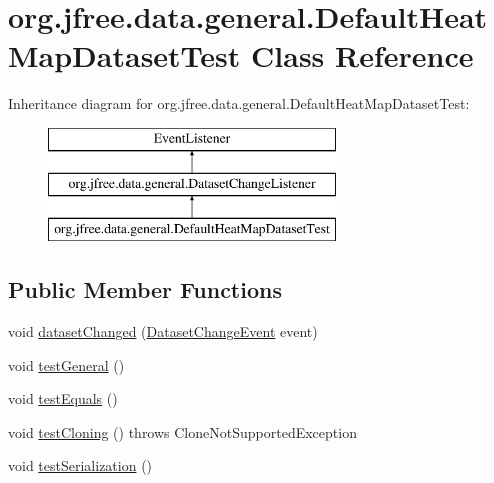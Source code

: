 \hypertarget{classorg_1_1jfree_1_1data_1_1general_1_1_default_heat_map_dataset_test}{}\section{org.\+jfree.\+data.\+general.\+Default\+Heat\+Map\+Dataset\+Test Class Reference}
\label{classorg_1_1jfree_1_1data_1_1general_1_1_default_heat_map_dataset_test}
Inheritance diagram for org.\+jfree.\+data.\+general.\+Default\+Heat\+Map\+Dataset\+Test\+:\begin{figure}[H]
\begin{center}
\leavevmode
\includegraphics[height=3.000000cm]{classorg_1_1jfree_1_1data_1_1general_1_1_default_heat_map_dataset_test}
\end{center}
\end{figure}
\subsection*{Public Member Functions}
\begin{DoxyCompactItemize}
\item 
void \mbox{\hyperlink{classorg_1_1jfree_1_1data_1_1general_1_1_default_heat_map_dataset_test_a100da8375a9df33cfaf02122bac9f131}{dataset\+Changed}} (\mbox{\hyperlink{classorg_1_1jfree_1_1data_1_1general_1_1_dataset_change_event}{Dataset\+Change\+Event}} event)
\item 
void \mbox{\hyperlink{classorg_1_1jfree_1_1data_1_1general_1_1_default_heat_map_dataset_test_a0dda3242d0bd72cc6c9d3396185b78dc}{test\+General}} ()
\item 
void \mbox{\hyperlink{classorg_1_1jfree_1_1data_1_1general_1_1_default_heat_map_dataset_test_a5950269d1e8baad089c15bfa98a94bf3}{test\+Equals}} ()
\item 
void \mbox{\hyperlink{classorg_1_1jfree_1_1data_1_1general_1_1_default_heat_map_dataset_test_a8295d924a79c11bec3df97fab5c3f9bf}{test\+Cloning}} ()  throws Clone\+Not\+Supported\+Exception 
\item 
void \mbox{\hyperlink{classorg_1_1jfree_1_1data_1_1general_1_1_default_heat_map_dataset_test_a3722936049e4b821de6dc4972e7f562a}{test\+Serialization}} ()
\end{DoxyCompactItemize}


